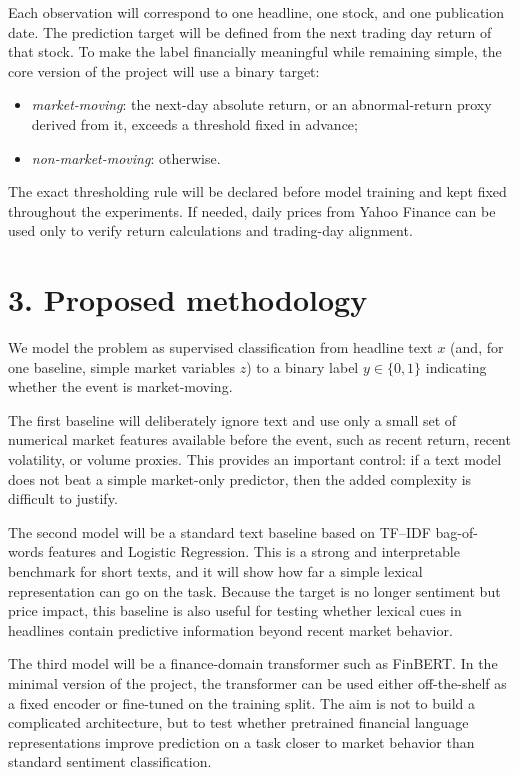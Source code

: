 \documentclass[11pt]{article}
\begin{document}
Each observation will correspond to one headline, one stock, and one publication date. The prediction target will be defined from the next trading day return of that stock. To make the label financially meaningful while remaining simple, the core version of the project will use a binary target:
\begin{itemize}[leftmargin=1.5em]
\item \emph{market-moving}: the next-day absolute return, or an abnormal-return proxy derived from it, exceeds a threshold fixed in advance;
\item \emph{non-market-moving}: otherwise.
\end{itemize}

The exact thresholding rule will be declared before model training and kept fixed throughout the experiments. If needed, daily prices from Yahoo Finance can be used only to verify return calculations and trading-day alignment.

\section*{3. Proposed methodology}
We model the problem as supervised classification from headline text $x$ (and, for one baseline, simple market variables $z$) to a binary label $y \in \{0,1\}$ indicating whether the event is market-moving.

The first baseline will deliberately ignore text and use only a small set of numerical market features available before the event, such as recent return, recent volatility, or volume proxies. This provides an important control: if a text model does not beat a simple market-only predictor, then the added complexity is difficult to justify.

The second model will be a standard text baseline based on TF--IDF bag-of-words features and Logistic Regression. This is a strong and interpretable benchmark for short texts, and it will show how far a simple lexical representation can go on the task. Because the target is no longer sentiment but price impact, this baseline is also useful for testing whether lexical cues in headlines contain predictive information beyond recent market behavior.

The third model will be a finance-domain transformer such as FinBERT. In the minimal version of the project, the transformer can be used either off-the-shelf as a fixed encoder or fine-tuned on the training split. The aim is not to build a complicated architecture, but to test whether pretrained financial language representations improve prediction on a task closer to market behavior than standard sentiment classification.
\end{document}
